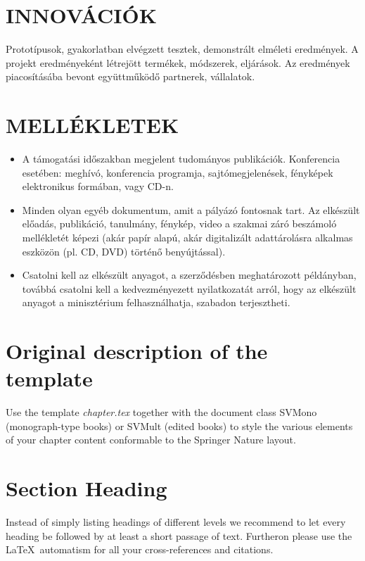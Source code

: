 \documentclass[graybox,envcountchap,sectrefs]{svmono}
\begin{document}
\section{INNOVÁCIÓK}
Prototípusok, gyakorlatban elvégzett tesztek, demonstrált elméleti eredmények.
A projekt eredményeként létrejött termékek, módszerek, eljárások.
Az eredmények piacosításába bevont együttműködő partnerek, vállalatok.

\section*{MELLÉKLETEK}


\begin{itemize}
	\item A támogatási időszakban megjelent tudományos publikációk. Konferencia esetében: meghívó, konferencia programja, sajtómegjelenések, fényképek elektronikus formában, vagy CD-n.
	\item Minden olyan egyéb dokumentum, amit a pályázó fontosnak tart.	
	Az elkészült előadás, publikáció, tanulmány, fénykép, video a szakmai záró beszámoló mellékletét képezi (akár papír alapú, akár digitalizált adattárolásra alkalmas eszközön (pl. CD, DVD) történő benyújtással).
	\item Csatolni kell az elkészült anyagot, a szerződésben meghatározott példányban, továbbá csatolni kell a kedvezményezett nyilatkozatát arról, hogy az elkészült anyagot a minisztérium felhasználhatja, szabadon terjesztheti.
\end{itemize}



\eject

\section{Original description of the template}

Use the template \emph{chapter.tex} together with the document class SVMono (monograph-type books) or SVMult (edited books) to style the various elements of your chapter content conformable to the Springer Nature layout.

\section{Section Heading}

Instead of simply listing headings of different levels we recommend to let every heading be followed by at least a short passage of text. Furtheron please use the \LaTeX\ automatism for all your cross-references and citations.
\end{document}
